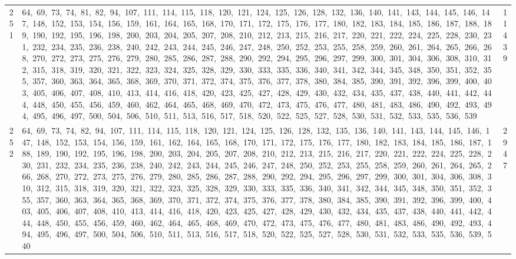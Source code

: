 \begin{longtable}{c|p{}|r}
251 & 64,\ 69,\ 73,\ 74,\ 81,\ 82,\ 94,\ 107,\ 111,\ 114,\ 115,\ 118,\ 120,\ 121,\ 124,\ 125,\ 126,\ 128,\ 132,\ 136,\ 140,\ 141,\ 143,\ 144,\ 145,\ 146,\ 147,\ 148,\ 152,\ 153,\ 154,\ 156,\ 159,\ 161,\ 164,\ 165,\ 168,\ 170,\ 171,\ 172,\ 175,\ 176,\ 177,\ 180,\ 182,\ 183,\ 184,\ 185,\ 186,\ 187,\ 188,\ 189,\ 190,\ 192,\ 195,\ 196,\ 198,\ 200,\ 203,\ 204,\ 205,\ 207,\ 208,\ 210,\ 212,\ 213,\ 215,\ 216,\ 217,\ 220,\ 221,\ 222,\ 224,\ 225,\ 228,\ 230,\ 231,\ 232,\ 234,\ 235,\ 236,\ 238,\ 240,\ 242,\ 243,\ 244,\ 245,\ 246,\ 247,\ 248,\ 250,\ 252,\ 253,\ 255,\ 258,\ 259,\ 260,\ 261,\ 264,\ 265,\ 266,\ 268,\ 270,\ 272,\ 273,\ 275,\ 276,\ 279,\ 280,\ 285,\ 286,\ 287,\ 288,\ 290,\ 292,\ 294,\ 295,\ 296,\ 297,\ 299,\ 300,\ 301,\ 304,\ 306,\ 308,\ 310,\ 312,\ 315,\ 318,\ 319,\ 320,\ 321,\ 322,\ 323,\ 324,\ 325,\ 328,\ 329,\ 330,\ 333,\ 335,\ 336,\ 340,\ 341,\ 342,\ 344,\ 345,\ 348,\ 350,\ 351,\ 352,\ 355,\ 357,\ 360,\ 363,\ 364,\ 365,\ 368,\ 369,\ 370,\ 371,\ 372,\ 374,\ 375,\ 376,\ 377,\ 378,\ 380,\ 384,\ 385,\ 390,\ 391,\ 392,\ 396,\ 399,\ 400,\ 403,\ 405,\ 406,\ 407,\ 408,\ 410,\ 413,\ 414,\ 416,\ 418,\ 420,\ 423,\ 425,\ 427,\ 428,\ 429,\ 430,\ 432,\ 434,\ 435,\ 437,\ 438,\ 440,\ 441,\ 442,\ 444,\ 448,\ 450,\ 455,\ 456,\ 459,\ 460,\ 462,\ 464,\ 465,\ 468,\ 469,\ 470,\ 472,\ 473,\ 475,\ 476,\ 477,\ 480,\ 481,\ 483,\ 486,\ 490,\ 492,\ 493,\ 494,\ 495,\ 496,\ 497,\ 500,\ 504,\ 506,\ 510,\ 511,\ 513,\ 516,\ 517,\ 518,\ 520,\ 522,\ 525,\ 527,\ 528,\ 530,\ 531,\ 532,\ 533,\ 535,\ 536,\ 539 & 11439 \\
252 & 64,\ 69,\ 73,\ 74,\ 82,\ 94,\ 107,\ 111,\ 114,\ 115,\ 118,\ 120,\ 121,\ 124,\ 125,\ 126,\ 128,\ 132,\ 135,\ 136,\ 140,\ 141,\ 143,\ 144,\ 145,\ 146,\ 147,\ 148,\ 152,\ 153,\ 154,\ 156,\ 159,\ 161,\ 162,\ 164,\ 165,\ 168,\ 170,\ 171,\ 172,\ 175,\ 176,\ 177,\ 180,\ 182,\ 183,\ 184,\ 185,\ 186,\ 187,\ 188,\ 189,\ 190,\ 192,\ 195,\ 196,\ 198,\ 200,\ 203,\ 204,\ 205,\ 207,\ 208,\ 210,\ 212,\ 213,\ 215,\ 216,\ 217,\ 220,\ 221,\ 222,\ 224,\ 225,\ 228,\ 230,\ 231,\ 232,\ 234,\ 235,\ 236,\ 238,\ 240,\ 242,\ 243,\ 244,\ 245,\ 246,\ 247,\ 248,\ 250,\ 252,\ 253,\ 255,\ 258,\ 259,\ 260,\ 261,\ 264,\ 265,\ 266,\ 268,\ 270,\ 272,\ 273,\ 275,\ 276,\ 279,\ 280,\ 285,\ 286,\ 287,\ 288,\ 290,\ 292,\ 294,\ 295,\ 296,\ 297,\ 299,\ 300,\ 301,\ 304,\ 306,\ 308,\ 310,\ 312,\ 315,\ 318,\ 319,\ 320,\ 321,\ 322,\ 323,\ 325,\ 328,\ 329,\ 330,\ 333,\ 335,\ 336,\ 340,\ 341,\ 342,\ 344,\ 345,\ 348,\ 350,\ 351,\ 352,\ 355,\ 357,\ 360,\ 363,\ 364,\ 365,\ 368,\ 369,\ 370,\ 371,\ 372,\ 374,\ 375,\ 376,\ 377,\ 378,\ 380,\ 384,\ 385,\ 390,\ 391,\ 392,\ 396,\ 399,\ 400,\ 403,\ 405,\ 406,\ 407,\ 408,\ 410,\ 413,\ 414,\ 416,\ 418,\ 420,\ 423,\ 425,\ 427,\ 428,\ 429,\ 430,\ 432,\ 434,\ 435,\ 437,\ 438,\ 440,\ 441,\ 442,\ 444,\ 448,\ 450,\ 455,\ 456,\ 459,\ 460,\ 462,\ 464,\ 465,\ 468,\ 469,\ 470,\ 472,\ 473,\ 475,\ 476,\ 477,\ 480,\ 481,\ 483,\ 486,\ 490,\ 492,\ 493,\ 494,\ 495,\ 496,\ 497,\ 500,\ 504,\ 506,\ 510,\ 511,\ 513,\ 516,\ 517,\ 518,\ 520,\ 522,\ 525,\ 527,\ 528,\ 530,\ 531,\ 532,\ 533,\ 535,\ 536,\ 539,\ 540 & 2947 \\

\end{longtable}

